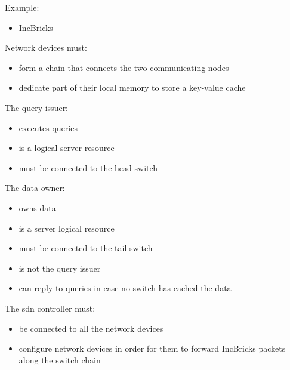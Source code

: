 Example:
\begin{itemize}
    \item IncBricks \cite{incbricks}
\end{itemize}
Network devices must:
\begin{itemize}
    \item form a chain that connects the two communicating nodes
    \item dedicate part of their local memory to store a key-value cache
\end{itemize}
The query issuer:
\begin{itemize}
    \item executes queries
    \item is a logical server resource
    \item must be connected to the head switch
\end{itemize}
The data owner:
\begin{itemize}
    \item owns data
    \item is a server logical resource
    \item must be connected to the tail switch
    \item is not the query issuer
    \item can reply to queries in case no switch has cached the data
\end{itemize}
The \gls{sdn} controller must:
\begin{itemize}
    \item be connected to all the network devices
    \item configure network devices in order for them to forward IncBricks \cite{incbricks} packets along the switch chain
\end{itemize}